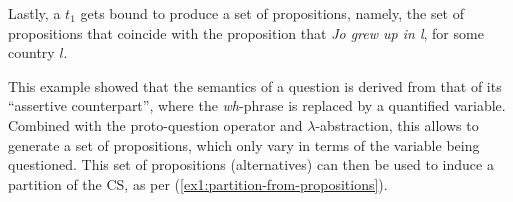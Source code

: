 \begin{exe}
\end{exe}

Lastly, a $t_1$ gets bound to produce a set of propositions, namely, the set of propositions that coincide with the proposition that \textit{Jo grew up in l}, for some country $l$. 

\begin{exe}
\end{exe}

This example showed that the semantics of a question is derived from that of its ``assertive counterpart'', where the \textit{wh}-phrase is replaced by a quantified variable. Combined with the proto-question operator and $\lambda$-abstraction, this allows to generate a set of propositions, which only vary in terms of the variable being questioned. This set of propositions (alternatives) can then be used to induce a partition of the CS, as per (\ref{ex1:partition-from-propositions}).


%















